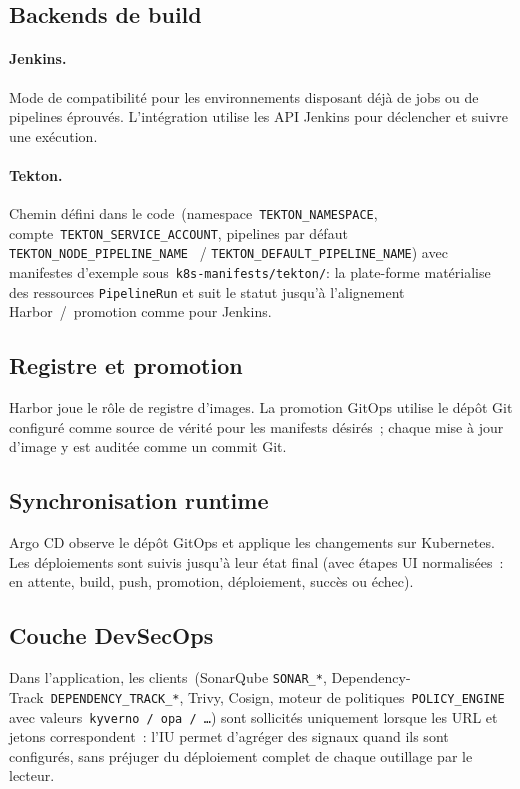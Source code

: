 \subsection{Backends de build}

\paragraph{Jenkins.}
Mode de compatibilité pour les environnements disposant déjà de jobs ou de pipelines éprouvés. L'intégration utilise les API Jenkins pour déclencher et suivre une exécution.

\paragraph{Tekton.}
Chemin défini dans le code~(namespace~\texttt{TEKTON\_NAMESPACE}, compte~\texttt{TEKTON\_SERVICE\_ACCOUNT}, pipelines par défaut \texttt{TEKTON\_NODE\_PIPELINE\_NAME} ~/ \texttt{TEKTON\_DEFAULT\_PIPELINE\_NAME}) avec manifestes d'exemple sous~\texttt{k8s-manifests/tekton/}: la plate-forme matérialise des ressources \texttt{PipelineRun} et suit le statut jusqu'à l'alignement Harbor~/~promotion comme pour Jenkins.

\subsection{Registre et promotion}

Harbor joue le rôle de registre d'images. La promotion GitOps utilise le dépôt Git configuré comme source de vérité pour les manifests désirés~; chaque mise à jour d'image y est auditée comme un commit Git.

\subsection{Synchronisation runtime}

Argo CD observe le dépôt GitOps et applique les changements sur Kubernetes. Les déploiements sont suivis jusqu'à leur état final (avec étapes UI normalisées~: en attente, build, push, promotion, déploiement, succès ou échec).

\subsection{Couche DevSecOps}

Dans l'application, les clients~(SonarQube \texttt{SONAR\_*}, Dependency-Track~\texttt{DEPENDENCY\_TRACK\_*}, Trivy, Cosign, moteur de politiques~\texttt{POLICY\_ENGINE} avec valeurs~\texttt{kyverno~/~opa~/~\dots}) sont sollicités uniquement lorsque les URL et jetons correspondent~: l'IU permet d'agréger des signaux quand ils sont configurés, sans préjuger du déploiement complet de chaque outillage par le lecteur.

